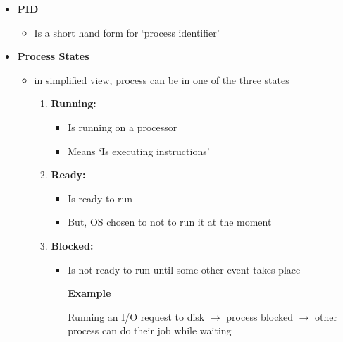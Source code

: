 \documentclass[12pt]{article}
\begin{document}
\begin{enumerate}[1.]
\begin{itemize}
        \item \textbf{PID}

        \begin{itemize}
            \item Is a short hand form for `process identifier'
        \end{itemize}

        \item \textbf{Process States}

        \begin{itemize}
            \item in simplified view, process can be in one of the three states

            \begin{enumerate}[1.]
                \item \textbf{Running:}
                \begin{itemize}
                    \item Is running on a processor
                    \item Means `Is executing instructions'
                \end{itemize}
                \item \textbf{Ready:}

                \begin{itemize}
                    \item Is ready to run
                    \item But, OS chosen to not to run it at the moment
                \end{itemize}
                \item \textbf{Blocked:}

                \begin{itemize}
                    \item Is not ready to run until some other event takes place

                    \bigskip

                    \underline{\textbf{Example}}

                    Running an I/O request to disk $\to$ process blocked $\to$ other process can do their job while waiting
                \end{itemize}
            \end{enumerate}
        \end{itemize}
    \end{itemize}


\end{enumerate}
\end{document}

